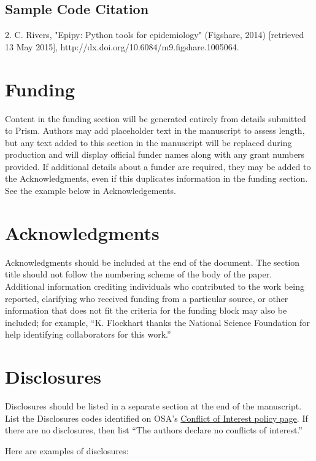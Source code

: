 \documentclass[9pt,twocolumn,twoside]{osajnl}
\begin{document}
\subsection{Sample Code Citation}

2. C. Rivers, "Epipy: Python tools for epidemiology" (Figshare, 2014) [retrieved 13 May 2015], http://dx.doi.org/10.6084/m9.figshare.1005064.

\section{Funding}
Content in the funding section will be generated entirely from details submitted to Prism. Authors may add placeholder text in the manuscript to assess length, but any text added to this section in the manuscript will be replaced during production and will display official funder names along with any grant numbers provided. If additional details about a funder are required, they may be added to the Acknowledgments, even if this duplicates information in the funding section. See the example below in Acknowledgements.

\section{Acknowledgments}
Acknowledgments should be included at the end of the document. The section title should not follow the numbering scheme of the body of the paper. Additional information crediting individuals who contributed to the work being reported, clarifying who received funding from a particular source, or other information that does not fit the criteria for the funding block may also be included; for example, ``K. Flockhart thanks the National Science Foundation for help identifying collaborators for this work.''

\section{Disclosures}

Disclosures should be listed in a separate section at the end of the manuscript. List the Disclosures codes identified on OSA's \href{http://www.osapublishing.org/submit/review/conflicts-interest-policy.cfm}{Conflict of Interest policy page}. If there are no disclosures, then list ``The authors declare no conflicts of interest.''

Here are examples of disclosures:

\medskip
\end{document}
